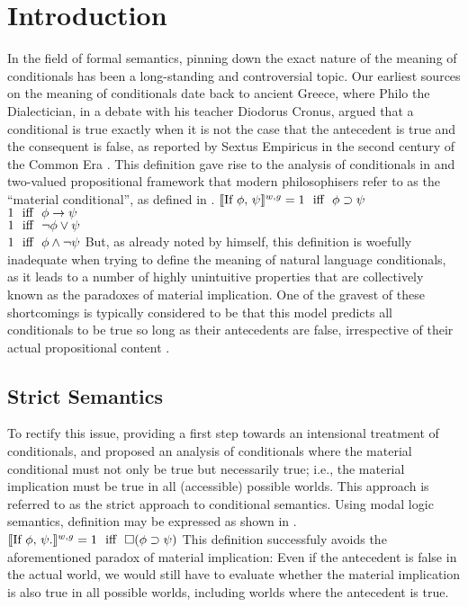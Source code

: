 \chapter{Introduction}
In the field of formal semantics, pinning down the exact nature of the meaning of conditionals has been a long-standing and controversial topic. Our earliest sources on the meaning of conditionals date back to ancient Greece, where Philo the Dialectician, in a debate with his teacher Diodorus Cronus, argued that a conditional is true exactly when it is not the case that the antecedent is true and the consequent is false, as reported by Sextus Empiricus in the second century of the Common Era \parencite{Kneale1962}. This definition gave rise to the analysis of conditionals in \textcite{Frege1879} and  two-valued propositional framework that modern philosophisers refer to as the \enquote{material conditional}, as defined in .
\ex{}
$\intension[w,g]{If $\phi$, $\psi$}=\textiff\phi\supset\psi$\\
$\textiff\phi\rightarrow\psi$\\
$\textiff\neg\phi\lor\psi$\\
$\textiff\phi\land\neg\psi$
\xe
But, as already noted by \textcite{Frege1879} himself, this definition is woefully inadequate when trying to define the meaning of natural language conditionals, as it leads to a number of highly unintuitive properties that are collectively known as the paradoxes of material implication. One of the gravest of these shortcomings is typically considered to be that this model predicts all conditionals to be true so long as their antecedents are false, irrespective of their actual propositional content \parencite{Lewis1912}.

\section{Strict Semantics}
To rectify this issue, providing a first step towards an intensional treatment of conditionals, \textcite[p.~33]{Peirce1896} and \textcite{Lewis1912,Lewis1914,Lewis1918} proposed an analysis of conditionals where the material conditional must not only be true but necessarily true; i.e., the material implication must be true in all (accessible) possible worlds. This approach is referred to as the strict approach to conditional semantics. Using  modal logic semantics,  definition may be expressed as shown in .
\ex{}\label{ex:strict-intro}
$\intension[w,g]{If $\phi$, $\psi$.}=\textiff\square(\phi\supset\psi)$
\xe
This definition successfuly avoids the aforementioned paradox of material implication: Even if the antecedent is false in the actual world, we would still have to evaluate whether the material implication is also true in all possible worlds, including worlds where the antecedent is true.

